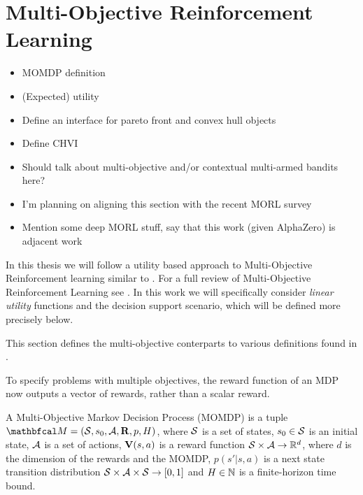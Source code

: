\section{Multi-Objective Reinforcement Learning}
\label{sec:2-3-morl}
    
    \begin{itemize}
        \item MOMDP definition
        \item (Expected) utility
        \item Define an interface for pareto front and convex hull objects
        \item Define CHVI
        \item Should talk about multi-objective and/or contextual multi-armed bandits here?
        \item I'm planning on aligning this section with the recent MORL survey \cite{morl_survey}
        \item Mention some deep MORL stuff, say that this work (given AlphaZero) is adjacent work
    \end{itemize}


    In this thesis we will follow a utility based approach to Multi-Objective Reinforcement learning similar to . For a full review of Multi-Objective Reinforcement Learning see . In this work we will specifically consider \textit{linear utility} functions and the decision support scenario, which will be defined more precisely below.

    This section defines the multi-objective conterparts to various definitions found in .

    To specify problems with multiple objectives, the reward function of an MDP now outputs a vector of rewards, rather than a scalar reward.

    \begin{defn}
        \label{def:mo_mdp}
        A \textnormal{Multi-Objective Markov Decision Process} (MOMDP) is a tuple $\bfcl{M}=(\cl{S},s_0,\cl{A},\bff{R},p,H)$, where $\mathcal{S}$ is a set of states, $s_0\in\mathcal{S}$ is an initial state, $\mathcal{A}$ is a set of actions, $\mathbf{V}(s,a)$ is a reward function $\mathcal{S}\times \mathcal{A}\rightarrow \mathbb{R}^d$, where $d$ is the dimension of the rewards and the MOMDP, $p(s' | s,a)$ is a next state transition distribution $\mathcal{S} \times \mathcal{A} \times \mathcal{S} \rightarrow [0,1]$ and $H\in\mathbb{N}$ is a finite-horizon time bound.
    \end{defn}

